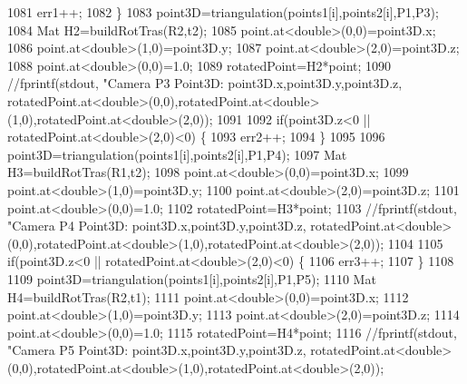 \begin{DoxyCode}
1081                  err1++;                 
1082              \}
1083              point3D=triangulation(points1[i],points2[i],P1,P3);
1084              Mat H2=buildRotTras(R2,t2);
1085              point.at<\textcolor{keywordtype}{double}>(0,0)=point3D.x;
1086              point.at<\textcolor{keywordtype}{double}>(1,0)=point3D.y;
1087              point.at<\textcolor{keywordtype}{double}>(2,0)=point3D.z;
1088              point.at<\textcolor{keywordtype}{double}>(0,0)=1.0;
1089              rotatedPoint=H2*point;  
1090              \textcolor{comment}{//fprintf(stdout, "Camera P3 Point3D: %
       point3D.x,point3D.y,point3D.z, rotatedPoint.at<double>(0,0),rotatedPoint.at<double>(1,0),rotatedPoint.at<double>(2,0));}
1091 
1092              \textcolor{keywordflow}{if}(point3D.z<0 || rotatedPoint.at<\textcolor{keywordtype}{double}>(2,0)<0) \{
1093                  err2++;                 
1094              \}
1095                           
1096              point3D=triangulation(points1[i],points2[i],P1,P4);   
1097              Mat H3=buildRotTras(R1,t2);
1098              point.at<\textcolor{keywordtype}{double}>(0,0)=point3D.x;
1099              point.at<\textcolor{keywordtype}{double}>(1,0)=point3D.y;
1100              point.at<\textcolor{keywordtype}{double}>(2,0)=point3D.z;
1101              point.at<\textcolor{keywordtype}{double}>(0,0)=1.0;
1102              rotatedPoint=H3*point;
1103              \textcolor{comment}{//fprintf(stdout, "Camera P4 Point3D: %
       point3D.x,point3D.y,point3D.z, rotatedPoint.at<double>(0,0),rotatedPoint.at<double>(1,0),rotatedPoint.at<double>(2,0));}
1104 
1105              \textcolor{keywordflow}{if}(point3D.z<0 || rotatedPoint.at<\textcolor{keywordtype}{double}>(2,0)<0) \{
1106                  err3++;                 
1107              \} 
1108              
1109              point3D=triangulation(points1[i],points2[i],P1,P5);
1110              Mat H4=buildRotTras(R2,t1);
1111              point.at<\textcolor{keywordtype}{double}>(0,0)=point3D.x;
1112              point.at<\textcolor{keywordtype}{double}>(1,0)=point3D.y;
1113              point.at<\textcolor{keywordtype}{double}>(2,0)=point3D.z;
1114              point.at<\textcolor{keywordtype}{double}>(0,0)=1.0;
1115              rotatedPoint=H4*point;
1116              \textcolor{comment}{//fprintf(stdout, "Camera P5 Point3D: %
       point3D.x,point3D.y,point3D.z, rotatedPoint.at<double>(0,0),rotatedPoint.at<double>(1,0),rotatedPoint.at<double>(2,0));}

\end{DoxyCode}
